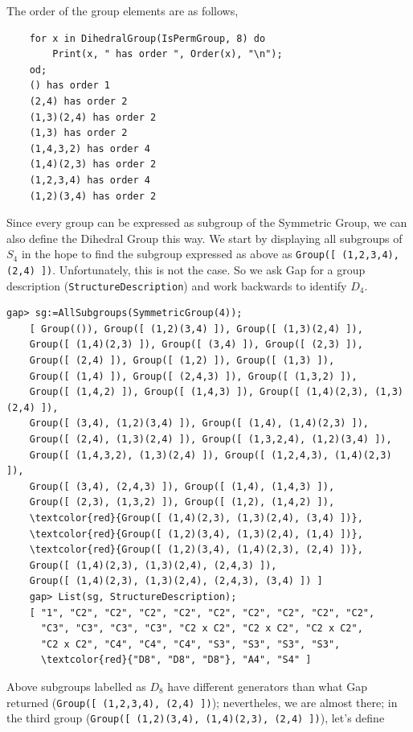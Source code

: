 The order of the group elements are as follows,

\begin{verbatim}
    for x in DihedralGroup(IsPermGroup, 8) do
        Print(x, " has order ", Order(x), "\n");
    od;
    () has order 1
    (2,4) has order 2
    (1,3)(2,4) has order 2
    (1,3) has order 2
    (1,4,3,2) has order 4
    (1,4)(2,3) has order 2
    (1,2,3,4) has order 4
    (1,2)(3,4) has order 2
\end{verbatim}

Since every group can be expressed as subgroup of the Symmetric Group, we can also define the Dihedral Group this way. We start by displaying all subgroups of $S_4$ in the hope to find the subgroup expressed as above as 
\verb+Group([ (1,2,3,4), (2,4) ])+. Unfortunately, this is not the case. So we ask Gap for a group description
(\verb+StructureDescription+) and work backwards to identify $D_4$.

\begin{Verbatim}[commandchars=\\\{\}]
    gap> sg:=AllSubgroups(SymmetricGroup(4));
    [ Group(()), Group([ (1,2)(3,4) ]), Group([ (1,3)(2,4) ]), 
    Group([ (1,4)(2,3) ]), Group([ (3,4) ]), Group([ (2,3) ]), 
    Group([ (2,4) ]), Group([ (1,2) ]), Group([ (1,3) ]), 
    Group([ (1,4) ]), Group([ (2,4,3) ]), Group([ (1,3,2) ]), 
    Group([ (1,4,2) ]), Group([ (1,4,3) ]), Group([ (1,4)(2,3), (1,3)(2,4) ]),
    Group([ (3,4), (1,2)(3,4) ]), Group([ (1,4), (1,4)(2,3) ]), 
    Group([ (2,4), (1,3)(2,4) ]), Group([ (1,3,2,4), (1,2)(3,4) ]),
    Group([ (1,4,3,2), (1,3)(2,4) ]), Group([ (1,2,4,3), (1,4)(2,3) ]), 
    Group([ (3,4), (2,4,3) ]), Group([ (1,4), (1,4,3) ]), 
    Group([ (2,3), (1,3,2) ]), Group([ (1,2), (1,4,2) ]), 
    \textcolor{red}{Group([ (1,4)(2,3), (1,3)(2,4), (3,4) ])},
    \textcolor{red}{Group([ (1,2)(3,4), (1,3)(2,4), (1,4) ])},
    \textcolor{red}{Group([ (1,2)(3,4), (1,4)(2,3), (2,4) ])},
    Group([ (1,4)(2,3), (1,3)(2,4), (2,4,3) ]), 
    Group([ (1,4)(2,3), (1,3)(2,4), (2,4,3), (3,4) ]) ]
    gap> List(sg, StructureDescription);
    [ "1", "C2", "C2", "C2", "C2", "C2", "C2", "C2", "C2", "C2", 
      "C3", "C3", "C3", "C3", "C2 x C2", "C2 x C2", "C2 x C2", 
      "C2 x C2", "C4", "C4", "C4", "S3", "S3", "S3", "S3", 
      \textcolor{red}{"D8", "D8", "D8"}, "A4", "S4" ]
\end{Verbatim}

Above subgroups labelled as $D_8$ have different generators than what Gap returned (\verb+Group([ (1,2,3,4), (2,4) ])+); nevertheles, we are almost there; in the third group (\verb+Group([ (1,2)(3,4), (1,4)(2,3), (2,4) ])+), let's define

